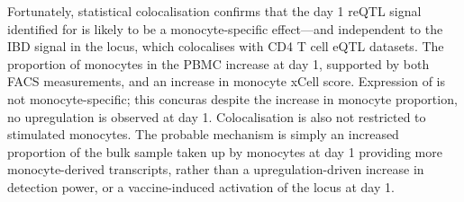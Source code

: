 Fortunately, statistical colocalisation confirms that the day 1 reQTL signal identified for  is likely to be a monocyte-specific effect---and independent to the IBD signal in the locus, which colocalises with CD4 T cell eQTL datasets.
The proportion of monocytes in the PBMC increase at day 1, supported by both FACS \autocite{sobolev2016AdjuvantedInfluenzaH1N1Vaccination} measurements, and an increase in monocyte xCell score.
Expression of  is not monocyte-specific; this concuras despite the increase in monocyte proportion, no upregulation is observed at day 1.
Colocalisation is also not restricted to stimulated monocytes.
The probable mechanism is simply an increased proportion of the bulk sample taken up by monocytes at day 1 providing more monocyte-derived  transcripts,
rather than a upregulation-driven increase in detection power,
or a vaccine-induced activation of the locus at day 1.



